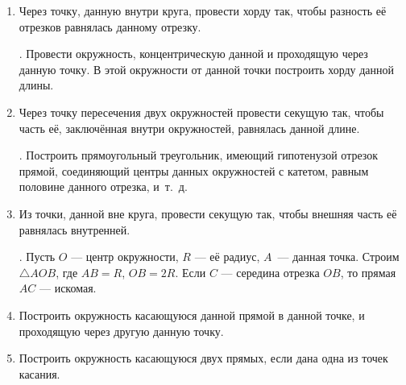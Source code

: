 {\begin{enumerate}
\item
Через точку, данную внутри круга, провести хорду так, чтобы разность её отрезков равнялась данному отрезку.

\smallskip
{}.
Провести окружность, концентрическую данной и проходящую через данную точку.
В этой окружности от данной точки построить хорду данной длины.


\item
Через точку пересечения двух окружностей провести секущую так, чтобы часть её, заключённая внутри окружностей, равнялась данной длине.

\smallskip
{}.
Построить прямоугольный треугольник, имеющий гипотенузой отрезок прямой, соединяющий центры данных окружностей с катетом, равным половине данного отрезка, и~т.~д.

\item
Из точки, данной вне круга, провести секущую так, чтобы внешняя часть её равнялась внутренней.

\smallskip
{}.
Пусть $O$ — центр окружности, $R$ — её радиус, $A$~— данная точка.
Строим $\triangle AOB$, где $AB=R$, $OB=2R$.
Если $C$ — середина отрезка $OB$, то прямая $AC$ — искомая.

\item
Построить окружность касающуюся данной прямой в данной точке, и проходящую через другую данную точку.

\item
Построить окружность касающуюся двух прямых, если дана одна из точек касания.

\end{enumerate}

}
